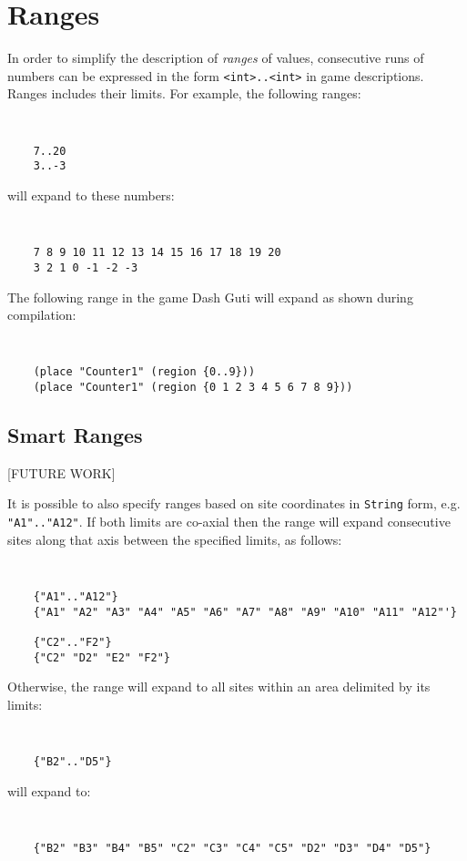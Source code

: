 \chapter{Ranges}  \label{Chapter:Ranges}

In order to simplify the description of {\it ranges} of values, consecutive runs of numbers can be expressed in the form {\tt <int>..<int>} in game descriptions. 
Ranges includes their limits. 
For example, the following ranges:

{\tt
\begin{verbatim}
    7..20
    3..-3
\end{verbatim}
}

\noindent
will expand to these numbers:

{\tt
\begin{verbatim}
    7 8 9 10 11 12 13 14 15 16 17 18 19 20
    3 2 1 0 -1 -2 -3 
\end{verbatim}
}

\noindent
The following range in the game Dash Guti will expand as shown during compilation:

{\tt
\begin{verbatim}
    (place "Counter1" (region {0..9}))
    (place "Counter1" (region {0 1 2 3 4 5 6 7 8 9}))
\end{verbatim}
}


\color {gray!95}
{

\section{Smart Ranges}

[FUTURE WORK]

\phantom{}
\noindent
It is possible to also specify ranges based on site coordinates in {\tt String} form, e.g. {\tt "A1".."A12"}.  
If both limits are co-axial then the range will expand consecutive sites along that axis between the specified limits, as follows:

{\tt
\begin{verbatim}
    {"A1".."A12"}
    {"A1" "A2" "A3" "A4" "A5" "A6" "A7" "A8" "A9" "A10" "A11" "A12"'}
    
    {"C2".."F2"}
    {"C2" "D2" "E2" "F2"}
 \end{verbatim}
}

\noindent
Otherwise, the range will expand to all sites within an area delimited by its limits:

{\tt
\begin{verbatim}
    {"B2".."D5"}
 \end{verbatim}
}

\noindent
will expand to:

{\tt
\begin{verbatim}
    {"B2" "B3" "B4" "B5" "C2" "C3" "C4" "C5" "D2" "D3" "D4" "D5"}
 \end{verbatim}
}

}
\color {black}{}
